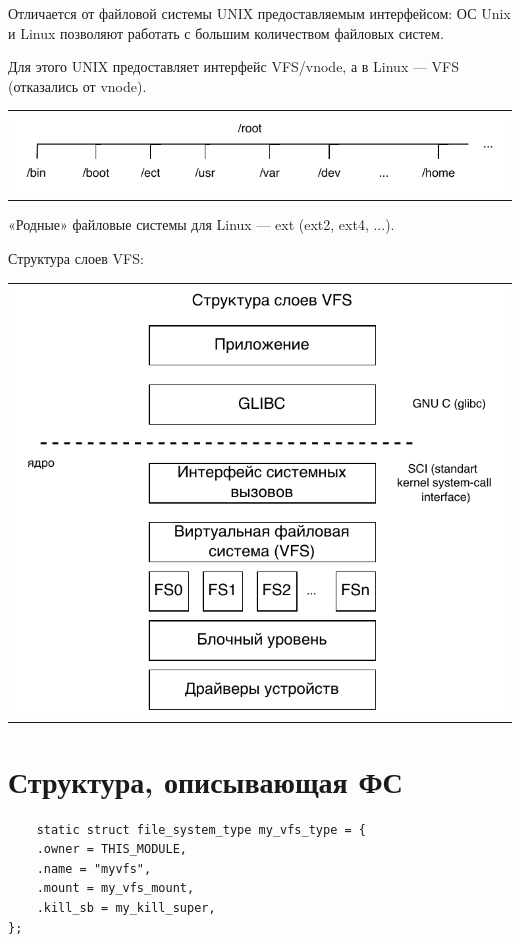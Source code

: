 Отличается от файловой системы UNIX предоставляемым интерфейсом: ОС Unix и Linux позволяют работать с большим количеством файловых систем.

Для этого UNIX предоставляет интерфейс VFS/vnode, а в Linux — VFS (отказались от vnode).

\begin{table}[h!]
  \centering
  \begin{tabular}{p{1\linewidth}}
    \centering
    \includegraphics[width=0.8\linewidth]{./images/root.pdf}
  \end{tabular}
\end{table}

«Родные» файловые системы для Linux — ext (ext2, ext4, ...).

Структура слоев VFS:

\begin{table}[h!]
  \centering
  \begin{tabular}{p{1\linewidth}}
    \centering
    \includegraphics[width=0.8\linewidth]{./images/VFS_struct.pdf}
  \end{tabular}
\end{table}

\section{Структура, описывающая ФС}

\begin{lstlisting}
	static struct file_system_type my_vfs_type = {
    .owner = THIS_MODULE,
    .name = "myvfs",
    .mount = my_vfs_mount,
    .kill_sb = my_kill_super,
};
\end{lstlisting}

